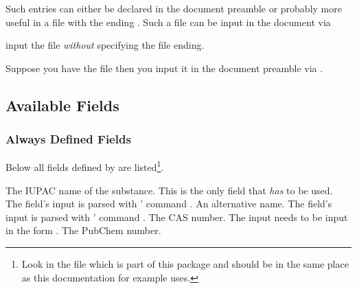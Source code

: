 \documentclass[DIV10,toc=index,toc=bib]{cnpkgdoc}
\begin{document}
Such entries can either be declared in the document preamble or probably
more useful in a file with the ending . Such a file can be input in
the document via
\begin{beschreibung}
  input the file \emph{without} specifying
   the file ending.
\end{beschreibung}
Suppose you have the file  then you input it in the
document preamble via .

\subsection{Available Fields}
\subsubsection{Always Defined Fields}
Below all fields defined by \substances are listed\footnote{Look in the file
 which is part of this package and
should be in the same place as this documentation for example uses.}.
\begin{beschreibung}
 \required The \acs{IUPAC} name of the substance. This is the only
   field that \emph{has} to be used. The field's input is parsed with
   ' command .
 \optional An alternative name. The field's input is parsed with
   ' command .
 \optional The \ac{CAS} number. The input needs to be input in the
   form .
 \optional The PubChem number.
\end{beschreibung}
\end{document}
